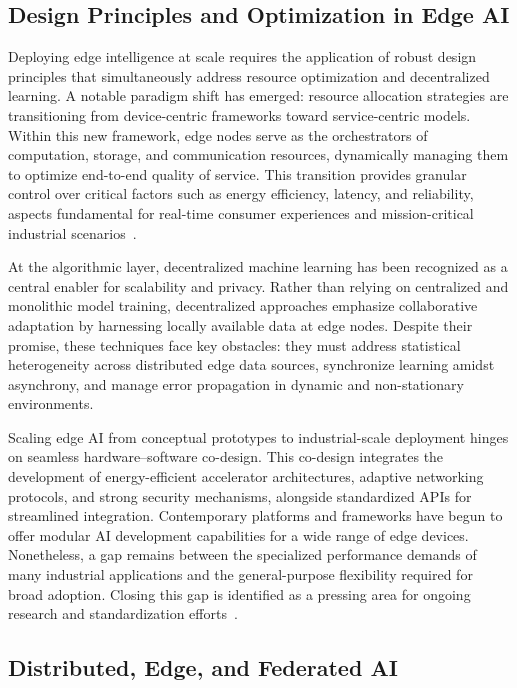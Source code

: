 \documentclass[sigconf]{acmart}
\begin{document}
\subsection{Design Principles and Optimization in Edge AI}

Deploying edge intelligence at scale requires the application of robust design principles that simultaneously address resource optimization and decentralized learning. A notable paradigm shift has emerged: resource allocation strategies are transitioning from device-centric frameworks toward service-centric models. Within this new framework, edge nodes serve as the orchestrators of computation, storage, and communication resources, dynamically managing them to optimize end-to-end quality of service. This transition provides granular control over critical factors such as energy efficiency, latency, and reliability, aspects fundamental for real-time consumer experiences and mission-critical industrial scenarios~\cite{ref49}.

At the algorithmic layer, decentralized machine learning has been recognized as a central enabler for scalability and privacy. Rather than relying on centralized and monolithic model training, decentralized approaches emphasize collaborative adaptation by harnessing locally available data at edge nodes. Despite their promise, these techniques face key obstacles: they must address statistical heterogeneity across distributed edge data sources, synchronize learning amidst asynchrony, and manage error propagation in dynamic and non-stationary environments.

Scaling edge AI from conceptual prototypes to industrial-scale deployment hinges on seamless hardware–software co-design. This co-design integrates the development of energy-efficient accelerator architectures, adaptive networking protocols, and strong security mechanisms, alongside standardized APIs for streamlined integration. Contemporary platforms and frameworks have begun to offer modular AI development capabilities for a wide range of edge devices. Nonetheless, a gap remains between the specialized performance demands of many industrial applications and the general-purpose flexibility required for broad adoption. Closing this gap is identified as a pressing area for ongoing research and standardization efforts~\cite{ref49}.

\subsection{Distributed, Edge, and Federated AI}
\end{document}
